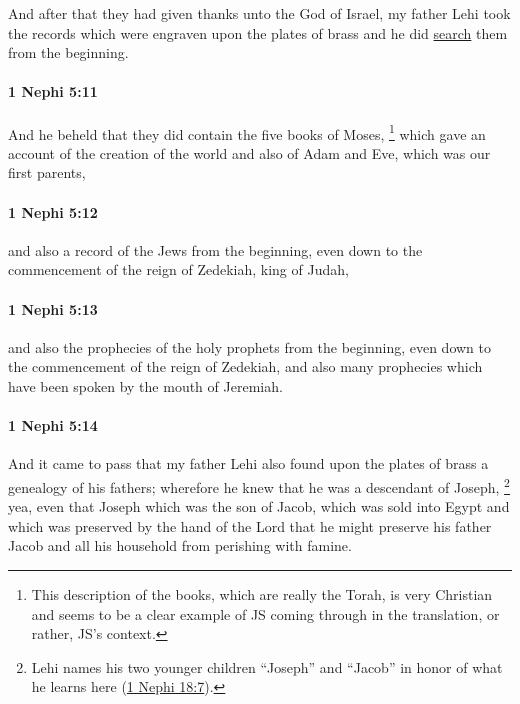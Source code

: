 			And after that they had given thanks unto the God of Israel,
			my father Lehi took the records which were engraven upon the plates of brass
			and he did \hyperref[SEARCH-1828]{search} them from the beginning.

		\paragraph{1 Nephi 5:11} %
			\label{1NEPHI-5-11}

			And he beheld that they did contain the five books of Moses,%
				\footnote{%
					This description of the books, which are really the Torah, is very Christian and seems to be a clear example of JS coming through in the translation, or rather, JS's context.
					}
			which gave an account of the creation of the world
			and also of Adam and Eve, which was our first parents,

		\paragraph{1 Nephi 5:12} %
			\label{1NEPHI-5-12}

			and also a record of the Jews from the beginning,
			even down to the commencement of the reign of Zedekiah, king of Judah,

		\paragraph{1 Nephi 5:13} %
			\label{1NEPHI-5-13}

			and also the prophecies of the holy prophets from the beginning,
			even down to the commencement of the reign of Zedekiah,
			and also many prophecies which have been spoken by the mouth of Jeremiah.

		\paragraph{1 Nephi 5:14} %
			\label{1NEPHI-5-14}

			And it came to pass that my father Lehi also found
			upon the plates of brass a genealogy of his fathers;
			wherefore he knew that he was a descendant of Joseph,%
				\footnote{%
					Lehi names his two younger children ``Joseph'' and ``Jacob'' in honor of what he learns here (\hyperref[1NEPHI-18-7]{1 Nephi 18:7}).
					}
			yea, even that Joseph which was the son of Jacob,
			which was sold into Egypt and which was preserved by the hand of the Lord
			that he might preserve his father Jacob and all his household
			from perishing with famine.

